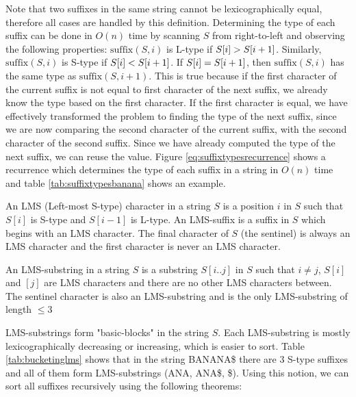 Note that two suffixes in the same string cannot be lexicographically equal, therefore all
cases are handled by this definition. Determining the type of each suffix can be done in
$O(n)$ time by scanning $S$ from right-to-left and observing the following properties:
$\mathrm{suffix}(S, i)$ is L-type if $S[{i}] > S[{i + 1}]$.
Similarly, $\mathrm{suffix}(S, i)$ is S-type if $S[{i}] < S[{i +
1}]$. If $S[{i}] = S[{i + 1}]$, then $\mathrm{suffix}(S, i)$ has
the same type as $\mathrm{suffix}(S, i + 1)$. This is true because if the first character
of the current suffix is not equal to first character of the next suffix, we already know
the type based on the first character. If the first character is equal, we have
effectively transformed the problem to finding the type of the next suffix, since we are
now comparing the second character of the current suffix, with the second character of the
second suffix. Since we have already computed the type of the next suffix, we can reuse
the value. Figure \ref{eq:suffixtypesrecurrence} shows a recurrence which determines the
type of each suffix in a string in $O(n)$ time and table \ref{tab:suffixtypesbanana} shows
an example.

\begin{definition}

    An LMS (Left-most S-type) character in a string $S$ is a position $i$ in $S$ such that
    $S[i]$ is S-type and $S[i-1]$ is L-type. An LMS-suffix is a suffix in $S$ which begins
    with an LMS character. The final character of $S$ (the sentinel) is always an LMS
    character and the first character is never an LMS character.

\end{definition}

\begin{definition}

    An LMS-substring in a string $S$ is a substring $S[i..j]$ in $S$ such that $i \neq j$,
    $S[i]$ and $[j]$ are LMS characters and there are no other LMS characters between. The
    sentinel character is also an LMS-substring and is the only LMS-substring of length
    $\leq 3$

\end{definition}

LMS-substrings form "basic-blocks" in the string $S$. Each LMS-substring is mostly
lexicographically decreasing or increasing, which is easier to sort. Table
\ref{tab:bucketinglms} shows that in the string BANANA\$ there are 3 S-type suffixes
and all of them form LMS-substrings (ANA, ANA\$, \$). Using this notion, we can sort all
suffixes recursively using the following theorems:

